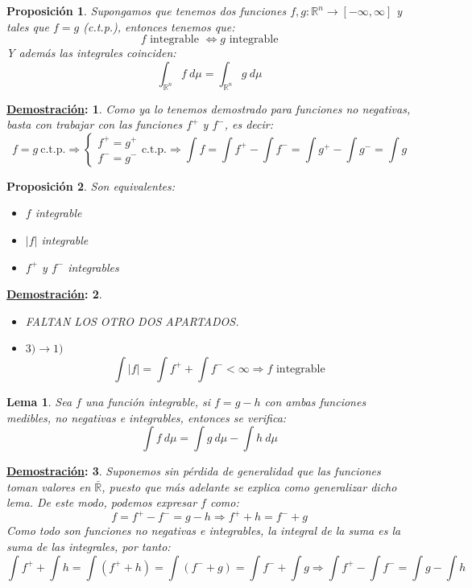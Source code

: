 \documentclass[10pt,a4paper,openright]{book}
\theoremstyle{break}
\newtheorem*{lema}{Lema}
\newtheorem*{prop}{Proposición}
\newtheorem*{demo}{\underline{Demostración}:}
\newcommand{\dif}[1]{\ d#1}
\begin{document}
\begin{prop}
Supongamos que tenemos dos funciones $f,g: \mathbb{R}^n \rightarrow [-\infty, \infty]$ y tales que $f=g$ (c.t.p.), entonces tenemos que:
$$f \mbox{ integrable }\Leftrightarrow g \mbox{ integrable}$$
Y además las integrales coinciden:
$$\int_{\mathbb{R}^n} f \dif{\mu} = \int_{\mathbb{R}^n} g \dif{\mu}$$
\end{prop}
\begin{demo}
Como ya lo tenemos demostrado para funciones no negativas, basta con trabajar con las funciones $f^+$ y $f^-$, es decir:
$$f=g \ \mbox{c.t.p.}\Rightarrow \begin{cases}
f^+ = g^+ \\ f^- = g^- 
\end{cases} \mbox{c.t.p.}\Rightarrow \int f = \int f^+ - \int f^- = \int g^+ - \int g^- = \int g$$
\end{demo}

\begin{prop}
Son equivalentes:
\begin{itemize}
\item $f$ integrable
\item $|f|$ integrable
\item $f^+$ y $f^-$ integrables
\end{itemize}
\end{prop}
\begin{demo}
\begin{itemize}
\item FALTAN LOS OTRO DOS APARTADOS.
\item $3)\rightarrow 1)$
$$\int |f| = \int f^+ + \int f^- < \infty \Rightarrow f \mbox{ integrable}$$
\end{itemize}
\end{demo}

\begin{lema}
Sea $f$ una función integrable, si $f = g - h$ con ambas funciones medibles, no negativas e integrables, entonces se verifica:
$$\int f \dif{\mu}= \int g \dif{\mu} - \int h \dif{\mu}$$
\end{lema}
\begin{demo}
Suponemos sin pérdida de generalidad que las funciones toman valores en $\bar{\mathbb{R}}$, puesto que más adelante se explica como generalizar dicho lema. De este modo, podemos expresar $f$ como:
$$f = f^+ - f^- = g-h\Rightarrow f^+ + h = f^- + g$$
Como todo son funciones no negativas e integrables, la integral de la suma es la suma de las integrales, por tanto:
$$\int f^+ + \int h = \int (f^+ + h) = \int (f^- + g)  = \int f^- + \int g \Rightarrow \int f^+ - \int f^- = \int g - \int h$$
\end{demo}
\end{document}
